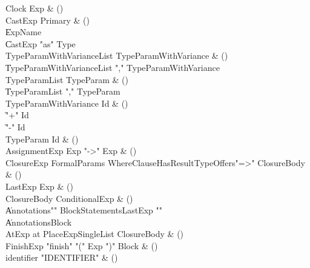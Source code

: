 \begin{bbgrammar}

 Clock  \label{prod:Clock}  \: Exp & ()\\
 CastExp  \label{prod:CastExp}  \: Primary & ()\\
    \| ExpName\\
    \| CastExp \xcd"as" Type\\
 TypeParamWithVarianceList  \label{prod:TypeParamWithVarianceList}  \: TypeParamWithVariance & ()\\
    \| TypeParamWithVarianceList \xcd"," TypeParamWithVariance\\
 TypeParamList  \label{prod:TypeParamList}  \: TypeParam & ()\\
    \| TypeParamList \xcd"," TypeParam\\
 TypeParamWithVariance  \label{prod:TypeParamWithVariance}  \: Id & ()\\
    \| \xcd"+" Id\\
    \| \xcd"-" Id\\
 TypeParam  \label{prod:TypeParam}  \: Id & ()\\
 AssignmentExp  \label{prod:AssignmentExp}  \: Exp  \xcd"->" Exp  & ()\\
 ClosureExp  \label{prod:ClosureExp}  \: FormalParams WhereClause\opt HasResultType\opt Offers\opt \xcd"=>" ClosureBody & ()\\
 LastExp  \label{prod:LastExp}  \: Exp & ()\\
 ClosureBody  \label{prod:ClosureBody}  \: ConditionalExp & ()\\
    \| Annotations\opt \xcd"{" BlockStatements\opt LastExp \xcd"}"\\
    \| Annotations\opt Block\\
 AtExp  \label{prod:AtExp}  \: at PlaceExpSingleList ClosureBody & ()\\
 FinishExp  \label{prod:FinishExp}  \: \xcd"finish" \xcd"(" Exp \xcd")" Block & ()\\
 identifier  \label{prod:identifier}  \: \xcd"IDENTIFIER"  & ()\\

\end{bbgrammar}
